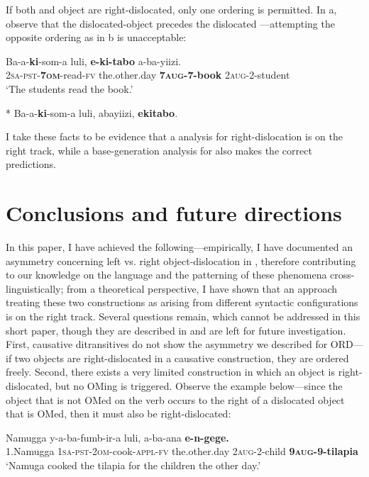 \documentclass[output=paper
,newtxmath
,modfonts
,nonflat]{langsci/langscibook}
\begin{document}
If both  and object are right-dislocated, only one ordering is permitted. In a, observe that the dislocated-object precedes the dislocated —attempting the opposite ordering as in b is unacceptable:

\ea\label{ex:ranero:41}
\ea\label{ex:ranero:41a}
\gll Ba-a-\textbf{ki}{}-som-a      luli,        \textbf{e-ki-tabo} a-ba-yiizi.\\
\textsc{2sa-pst-}\textbf{\textsc{7om}}{}-read-\textsc{fv} the.other.day \textbf{\textsc{7aug-7}}\textbf{{}-book} \textsc{2aug}{}-2-student\\
\glt ‘The students read the book.’

\ex\label{ex:ranero:41b}
* Ba-a-\textbf{ki}{}-som-a  luli,   abayiizi,   \textbf{ekitabo}.
\z
\z

\textup{I take these facts to be evidence that a  analysis for right-dislocation is on the right track, while a base-generation analysis for  also makes the correct predictions.}


\section{Conclusions and future directions}\label{sec:ranero:6}

\textup{In this paper, I have achieved the following—empirically, I have documented an asymmetry concerning left vs. right object-dislocation in , therefore contributing to our knowledge on the language and the patterning of these phenomena cross-linguistically; from a theoretical perspective, I have shown that an approach treating these two constructions as arising from different syntactic configurations is on the right track. Several questions remain, which cannot be addressed in this short paper, though they are described in \citet{ranero2015} and are left for future investigation. First, causative ditransitives do not show the asymmetry we described for ORD—if two objects are right-dislocated in a causative construction, they are ordered freely. Second, there exists a very limited construction in which an object is right-dislocated, but no OMing is triggered. Observe the example below—since the object that is not OMed on the verb occurs to the right of a dislocated object that is OMed, then it must also be right-dislocated:}


\ea\label{ex:ranero:42}
\gll Namugga    y-a-ba{}-fumb-ir-a           luli,             a-ba-ana         \textbf{e-n-gege.}\\
1.Namugga \textsc{1sa-pst-2om}{}-cook-\textsc{appl-fv} the.other.day \textsc{2aug-}2-child \textbf{\textsc{9aug-}}\textbf{9-tilapia}\\
\glt ‘Namuga cooked the tilapia for the children the other day.’
\z
\end{document}

